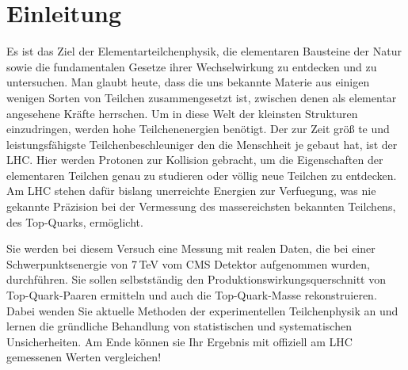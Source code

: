 \section{Einleitung}
\label{intro}
Es ist das Ziel der Elementarteilchenphysik, die elementaren Bausteine der Natur sowie die fundamentalen Gesetze ihrer Wechselwirkung zu entdecken und zu untersuchen.
 Man glaubt heute, dass die uns bekannte Materie aus einigen wenigen Sorten von Teilchen zusammengesetzt ist, zwischen denen als elementar angesehene Kr\"afte herrschen.
 Um in diese Welt der kleinsten Strukturen einzudringen, werden hohe Teilchenenergien ben\"otigt. Der zur Zeit gr\"o\ss{} te und leistungsf\"ahigste Teilchenbeschleuniger den die
 Menschheit je gebaut hat, ist der LHC. Hier werden Protonen zur Kollision gebracht, um die Eigenschaften der elementaren Teilchen genau zu studieren oder v\"ollig neue 
 Teilchen zu entdecken. Am LHC stehen daf\"ur bislang unerreichte Energien zur Verfuegung, was nie gekannte Pr\"azision bei der Vermessung des massereichsten bekannten Teilchens,
 des Top-Quarks, erm\"oglicht. 

Sie werden bei diesem Versuch eine Messung mit realen Daten, die bei einer Schwerpunktsenergie von 7\,TeV vom CMS Detektor aufgenommen wurden, durchf\"uhren.
 Sie sollen selbstst\"andig den Produktionswirkungsquerschnitt von Top-Quark-Paaren ermitteln und auch die Top-Quark-Masse rekonstruieren.
 Dabei wenden Sie aktuelle Methoden der experimentellen Teilchenphysik an und lernen die gr\"undliche Behandlung von statistischen und systematischen Unsicherheiten.
 Am Ende k\"onnen sie Ihr Ergebnis mit offiziell am LHC gemessenen Werten vergleichen!

